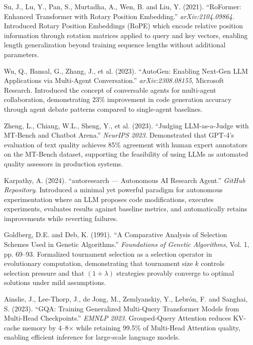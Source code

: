 \documentclass[a4paper,12pt,openany]{report}
\begin{document}
\begin{enumerate}[label={[\arabic*]}, leftmargin=2cm]
\item Su, J., Lu, Y., Pan, S., Murtadha, A., Wen, B. and Liu, Y. (2021). ``RoFormer: Enhanced Transformer with Rotary Position Embedding.'' \textit{arXiv:2104.09864}. Introduced Rotary Position Embeddings (RoPE) which encode relative position information through rotation matrices applied to query and key vectors, enabling length generalization beyond training sequence lengths without additional parameters.

\item Wu, Q., Bansal, G., Zhang, J., et al. (2023). ``AutoGen: Enabling Next-Gen LLM Applications via Multi-Agent Conversation.'' \textit{arXiv:2308.08155}, Microsoft Research. Introduced the concept of conversable agents for multi-agent collaboration, demonstrating 23\% improvement in code generation accuracy through agent debate patterns compared to single-agent baselines.

\item Zheng, L., Chiang, W.L., Sheng, Y., et al. (2023). ``Judging LLM-as-a-Judge with MT-Bench and Chatbot Arena.'' \textit{NeurIPS 2023}. Demonstrated that GPT-4's evaluation of text quality achieves 85\% agreement with human expert annotators on the MT-Bench dataset, supporting the feasibility of using LLMs as automated quality assessors in production systems.

\item Karpathy, A. (2024). ``autoresearch --- Autonomous AI Research Agent.'' \textit{GitHub Repository}. Introduced a minimal yet powerful paradigm for autonomous experimentation where an LLM proposes code modifications, executes experiments, evaluates results against baseline metrics, and automatically retains improvements while reverting failures.

\item Goldberg, D.E. and Deb, K. (1991). ``A Comparative Analysis of Selection Schemes Used in Genetic Algorithms.'' \textit{Foundations of Genetic Algorithms}, Vol. 1, pp. 69--93. Formalized tournament selection as a selection operator in evolutionary computation, demonstrating that tournament size $k$ controls selection pressure and that $(1+\lambda)$ strategies provably converge to optimal solutions under mild assumptions.

\item Ainslie, J., Lee-Thorp, J., de Jong, M., Zemlyanskiy, Y., Lebr\'{o}n, F. and Sanghai, S. (2023). ``GQA: Training Generalized Multi-Query Transformer Models from Multi-Head Checkpoints.'' \textit{EMNLP 2023}. Grouped-Query Attention reduces KV-cache memory by 4--8$\times$ while retaining 99.5\% of Multi-Head Attention quality, enabling efficient inference for large-scale language models.


\end{enumerate}
\end{document}
